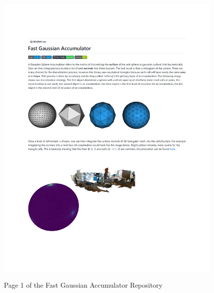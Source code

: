 \begin{figure}[h!]
    \centering\includegraphics[page=1, trim=1.2in 1.2in 1.2in 1.15in, width=.82\linewidth]{appendix_1/imgs/FastGAReadme.pdf}
    \label{fig:apx1_fg1}
    \caption{Page 1 of the Fast Gaussian Accumulator Repository} 
\end{figure}

